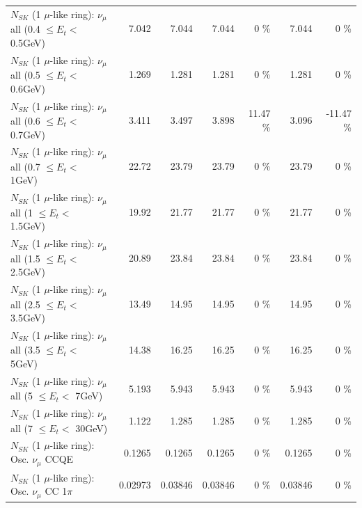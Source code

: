 \begin{table}
\begin{tabular}{| l | r | r | r  r | r  r |}
       $N_{SK}$ (1 $\mu$-like ring): $\nu_{\mu}$ all (0.4 $\leq E_{t} <$ 0.5GeV) &           7.042 &           7.044 &           7.044 &        0 \%  &           7.044 &        0 \%  \\ 
       $N_{SK}$ (1 $\mu$-like ring): $\nu_{\mu}$ all (0.5 $\leq E_{t} <$ 0.6GeV) &           1.269 &           1.281 &           1.281 &        0 \%  &           1.281 &        0 \%  \\ 
       $N_{SK}$ (1 $\mu$-like ring): $\nu_{\mu}$ all (0.6 $\leq E_{t} <$ 0.7GeV) &           3.411 &           3.497 &           3.898 &    11.47 \%  &           3.096 &   -11.47 \%  \\ 
         $N_{SK}$ (1 $\mu$-like ring): $\nu_{\mu}$ all (0.7 $\leq E_{t} <$ 1GeV) &           22.72 &           23.79 &           23.79 &        0 \%  &           23.79 &        0 \%  \\ 
         $N_{SK}$ (1 $\mu$-like ring): $\nu_{\mu}$ all (1 $\leq E_{t} <$ 1.5GeV) &           19.92 &           21.77 &           21.77 &        0 \%  &           21.77 &        0 \%  \\ 
       $N_{SK}$ (1 $\mu$-like ring): $\nu_{\mu}$ all (1.5 $\leq E_{t} <$ 2.5GeV) &           20.89 &           23.84 &           23.84 &        0 \%  &           23.84 &        0 \%  \\ 
       $N_{SK}$ (1 $\mu$-like ring): $\nu_{\mu}$ all (2.5 $\leq E_{t} <$ 3.5GeV) &           13.49 &           14.95 &           14.95 &        0 \%  &           14.95 &        0 \%  \\ 
         $N_{SK}$ (1 $\mu$-like ring): $\nu_{\mu}$ all (3.5 $\leq E_{t} <$ 5GeV) &           14.38 &           16.25 &           16.25 &        0 \%  &           16.25 &        0 \%  \\ 
           $N_{SK}$ (1 $\mu$-like ring): $\nu_{\mu}$ all (5 $\leq E_{t} <$ 7GeV) &           5.193 &           5.943 &           5.943 &        0 \%  &           5.943 &        0 \%  \\ 
          $N_{SK}$ (1 $\mu$-like ring): $\nu_{\mu}$ all (7 $\leq E_{t} <$ 30GeV) &           1.122 &           1.285 &           1.285 &        0 \%  &           1.285 &        0 \%  \\ 
\hline
\hline
                               $N_{SK}$ (1 $\mu$-like ring): Osc. $\nu_\mu$ CCQE &          0.1265 &          0.1265 &          0.1265 &        0 \%  &          0.1265 &        0 \%  \\ 
                          $N_{SK}$ (1 $\mu$-like ring): Osc. $\nu_\mu$ CC 1$\pi$ &         0.02973 &         0.03846 &         0.03846 &        0 \%  &         0.03846 &        0 \%  \\ 

\end{tabular}
\end{table}
